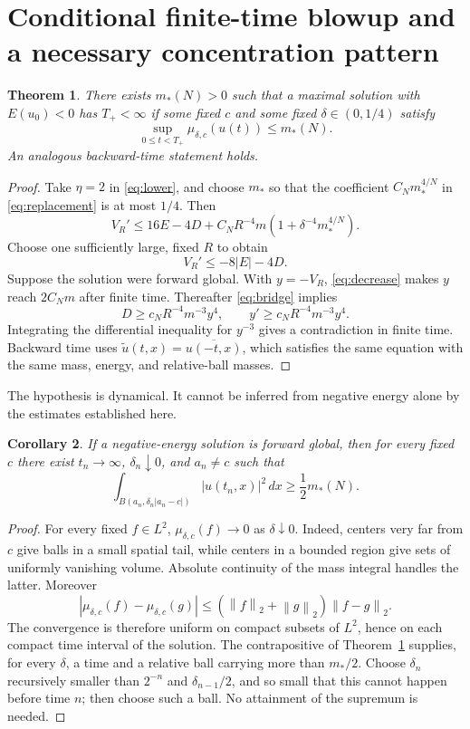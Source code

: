\documentclass[11pt,a4paper]{article}
\newtheorem{theorem}{Theorem}[section]
\newtheorem{corollary}[theorem]{Corollary}
\theoremstyle{remark}\newtheorem{remark}[theorem]{Remark}
\newcommand{\dd}{\,dx}
\newcommand{\norm}[1]{\left\|#1\right\|}
\begin{document}
\section{Conditional finite-time blowup and a necessary concentration pattern}
\begin{theorem}\label{thm:conditional}
There exists $m_*(N)>0$ such that a maximal solution with $E(u_0)<0$ has $T_+<\infty$ if some fixed $c$ and some fixed $\delta\in(0,1/4)$ satisfy
\begin{equation}\label{eq:condition}
 \sup_{0\le t<T_+}\mu_{\delta,c}(u(t))\le m_*(N).
\end{equation}
An analogous backward-time statement holds.
\end{theorem}
\begin{proof}
Take $\eta=2$ in \eqref{eq:lower}, and choose $m_*$ so that the coefficient $C_Nm_*^{4/N}$ in \eqref{eq:replacement} is at most $1/4$. Then
\[
 V_R'\le16E-4D+C_NR^{-4}m(1+\delta^{-4}m_*^{4/N}).
\]
Choose one sufficiently large, fixed $R$ to obtain
\begin{equation}\label{eq:decrease}
 V_R'\le-8|E|-4D.
\end{equation}
Suppose the solution were forward global. With $y=-V_R$, \eqref{eq:decrease} makes $y$ reach $2C_Nm$ after finite time. Thereafter \eqref{eq:bridge} implies
\[
 D\ge c_NR^{-4}m^{-3}y^4,\qquad y'\ge c_NR^{-4}m^{-3}y^4.
\]
Integrating the differential inequality for $y^{-3}$ gives a contradiction in finite time. Backward time uses $\widetilde u(t,x)=\overline{u(-t,x)}$, which satisfies the same equation with the same mass, energy, and relative-ball masses.
\end{proof}

The hypothesis is dynamical. It cannot be inferred from negative energy alone by the estimates established here.

\begin{corollary}\label{cor:concentration}
If a negative-energy solution is forward global, then for every fixed $c$ there exist $t_n\to\infty$, $\delta_n\downarrow0$, and $a_n\ne c$ such that
\[
 \int_{B(a_n,\delta_n|a_n-c|)}|u(t_n,x)|^2\dd\ge\frac12m_*(N).
\]
\end{corollary}
\begin{proof}
For every fixed $f\in L^2$, $\mu_{\delta,c}(f)\to0$ as $\delta\downarrow0$. Indeed, centers very far from $c$ give balls in a small spatial tail, while centers in a bounded region give sets of uniformly vanishing volume. Absolute continuity of the mass integral handles the latter. Moreover
\[
 |\mu_{\delta,c}(f)-\mu_{\delta,c}(g)|
 \le(\norm f_2+\norm g_2)\norm{f-g}_2.
\]
The convergence is therefore uniform on compact subsets of $L^2$, hence on each compact time interval of the solution. The contrapositive of Theorem~\ref{thm:conditional} supplies, for every $\delta$, a time and a relative ball carrying more than $m_*/2$. Choose $\delta_n$ recursively smaller than $2^{-n}$ and $\delta_{n-1}/2$, and so small that this cannot happen before time $n$; then choose such a ball. No attainment of the supremum is needed.
\end{proof}
\end{document}
